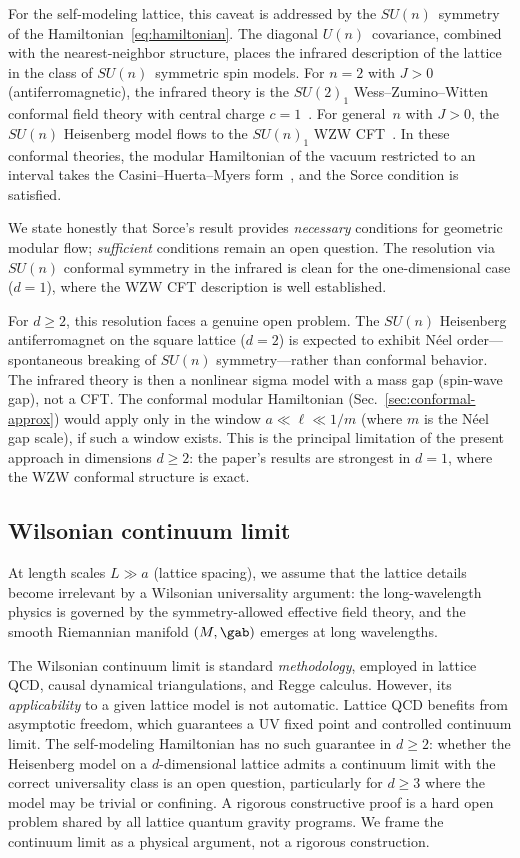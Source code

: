 For the self-modeling lattice, this caveat is addressed by the
$SU(n)$~symmetry of the Hamiltonian~\eqref{eq:hamiltonian}.  The
diagonal $U(n)$~covariance, combined with the nearest-neighbor
structure, places the infrared description of the lattice in the class
of $SU(n)$~symmetric spin models.  For $n = 2$ with $J > 0$
(antiferromagnetic), the infrared theory is the $SU(2)_1$
Wess--Zumino--Witten conformal field theory with central charge
$c = 1$~\cite{Affleck1986, AffleckHaldane1987}.  For general~$n$ with
$J > 0$, the $SU(n)$ Heisenberg model flows to the $SU(n)_1$ WZW
CFT~\cite{Affleck1986b}.  In these conformal theories, the modular
Hamiltonian of the vacuum restricted to an interval takes the
Casini--Huerta--Myers form~\cite{CasiniHuertaMyers2011}, and the
Sorce condition is satisfied.

We state honestly that Sorce's result provides \emph{necessary}
conditions for geometric modular flow; \emph{sufficient} conditions
remain an open question.  The resolution via $SU(n)$ conformal
symmetry in the infrared is clean for the one-dimensional case
($d = 1$), where the WZW CFT description is well established.

For $d \geq 2$, this resolution faces a genuine open problem.  The
$SU(n)$ Heisenberg antiferromagnet on the square lattice ($d = 2$) is
expected to exhibit N\'eel order---spontaneous breaking of $SU(n)$
symmetry---rather than conformal behavior.  The infrared theory is
then a nonlinear sigma model with a mass gap (spin-wave gap), not a
CFT.  The conformal modular Hamiltonian
(Sec.~\ref{sec:conformal-approx}) would apply only in the window
$a \ll \ell \ll 1/m$ (where $m$ is the N\'eel gap scale), if such a
window exists.  This is the principal limitation of the present
approach in dimensions $d \geq 2$: the paper's results are strongest
in $d = 1$, where the WZW conformal structure is exact.

\subsection{Wilsonian continuum limit}
\label{sec:continuum}

At length scales $L \gg a$ (lattice spacing), we assume that the
lattice details become irrelevant by a Wilsonian universality
argument: the long-wavelength physics is governed by the
symmetry-allowed effective field theory, and the smooth Riemannian
manifold $(M, \gab)$ emerges at long wavelengths.

The Wilsonian continuum limit is standard \emph{methodology}, employed
in lattice QCD, causal dynamical triangulations, and Regge calculus.
However, its \emph{applicability} to a given lattice model is not
automatic.  Lattice QCD benefits from asymptotic freedom, which
guarantees a UV fixed point and controlled continuum limit.  The
self-modeling Hamiltonian has no such guarantee in $d \geq 2$: whether
the Heisenberg model on a $d$-dimensional lattice admits a continuum
limit with the correct universality class is an open question,
particularly for $d \geq 3$ where the model may be trivial or
confining.  A rigorous constructive proof is a hard open problem shared
by all lattice quantum gravity programs.  We frame the continuum limit
as a physical argument, not a rigorous construction.

